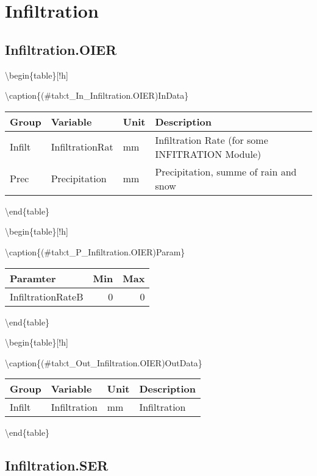 \documentclass[
]{book}
\begin{document}
\hypertarget{infiltration}{%
\section{Infiltration}\label{infiltration}}

\hypertarget{infiltration.oier}{%
\subsection{Infiltration.OIER}\label{infiltration.oier}}

\textbackslash begin\{table\}{[}!h{]}

\textbackslash caption\{(\#tab:t\_In\_Infiltration.OIER)InData\}
\centering

\begin{tabular}[t]{l|l|l|l}
\hline
Group & Variable & Unit & Description\\
\hline
Infilt & InfiltrationRat & mm & Infiltration Rate (for some INFITRATION Module)\\
\cline{1-4}
Prec & Precipitation & mm & Precipitation, summe of rain and snow\\
\hline
\end{tabular}

\textbackslash end\{table\}

\textbackslash begin\{table\}{[}!h{]}

\textbackslash caption\{(\#tab:t\_P\_Infiltration.OIER)Param\}
\centering

\begin{tabular}[t]{l|r|r}
\hline
Paramter & Min & Max\\
\hline
InfiltrationRateB & 0 & 0\\
\hline
\end{tabular}

\textbackslash end\{table\}

\textbackslash begin\{table\}{[}!h{]}

\textbackslash caption\{(\#tab:t\_Out\_Infiltration.OIER)OutData\}
\centering

\begin{tabular}[t]{l|l|l|l}
\hline
Group & Variable & Unit & Description\\
\hline
Infilt & Infiltration & mm & Infiltration\\
\hline
\end{tabular}

\textbackslash end\{table\}

\hypertarget{infiltration.ser}{%
\subsection{Infiltration.SER}\label{infiltration.ser}}
\end{document}
